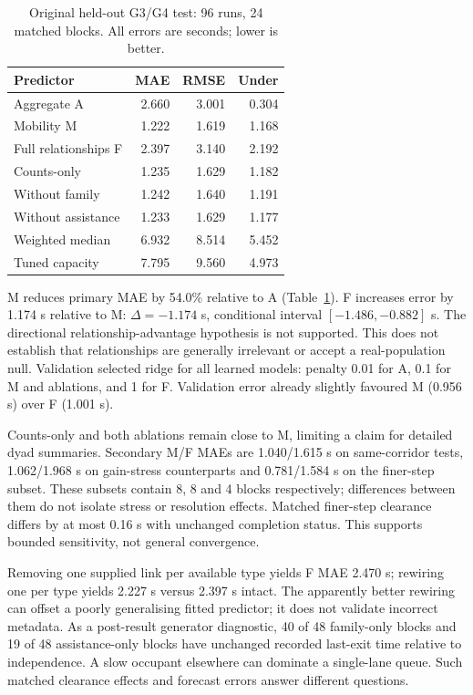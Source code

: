 \begin{table}[!t]\centering\small
\caption{Original held-out G3/G4 test: 96 runs, 24 matched blocks. All errors are seconds; lower is better.}
\label{tab:primary}
\begin{tabular}{lrrr}\toprule Predictor & MAE & RMSE & Under\\\midrule
Aggregate A & 2.660 & 3.001 & 0.304\\
Mobility M & 1.222 & 1.619 & 1.168\\
Full relationships F & 2.397 & 3.140 & 2.192\\
Counts-only & 1.235 & 1.629 & 1.182\\
Without family & 1.242 & 1.640 & 1.191\\
Without assistance & 1.233 & 1.629 & 1.177\\
Weighted median & 6.932 & 8.514 & 5.452\\
Tuned capacity & 7.795 & 9.560 & 4.973\\\bottomrule
\end{tabular}
\end{table}

M reduces primary MAE by 54.0\% relative to A (Table~\ref{tab:primary}). F increases error by 1.174 s relative to M: $\Delta=-1.174$ s, conditional interval $[-1.486,-0.882]$ s. The directional relationship-advantage hypothesis is not supported. This does not establish that relationships are generally irrelevant or accept a real-population null. Validation selected ridge for all learned models: penalty 0.01 for A, 0.1 for M and ablations, and 1 for F. Validation error already slightly favoured M (0.956 s) over F (1.001 s).

Counts-only and both ablations remain close to M, limiting a claim for detailed dyad summaries. Secondary M/F MAEs are 1.040/1.615 s on same-corridor tests, 1.062/1.968 s on gain-stress counterparts and 0.781/1.584 s on the finer-step subset. These subsets contain 8, 8 and 4 blocks respectively; differences between them do not isolate stress or resolution effects. Matched finer-step clearance differs by at most 0.16 s with unchanged completion status. This supports bounded sensitivity, not general convergence.

Removing one supplied link per available type yields F MAE 2.470 s; rewiring one per type yields 2.227 s versus 2.397 s intact. The apparently better rewiring can offset a poorly generalising fitted predictor; it does not validate incorrect metadata. As a post-result generator diagnostic, 40 of 48 family-only blocks and 19 of 48 assistance-only blocks have unchanged recorded last-exit time relative to independence. A slow occupant elsewhere can dominate a single-lane queue. Such matched clearance effects and forecast errors answer different questions.

